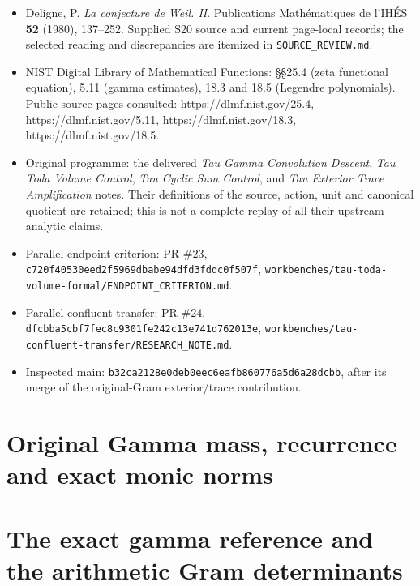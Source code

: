\documentclass[11pt,a4paper]{article}
\begin{document}
\begin{itemize}
\tightlist
\item
  Deligne, P. \emph{La conjecture de Weil. II}. Publications Mathématiques de l'IHÉS \textbf{52} (1980), 137--252. Supplied S20 source and current page-local records; the selected reading and discrepancies are itemized in \nolinkurl{SOURCE_REVIEW.md}.
\item
  NIST Digital Library of Mathematical Functions: §§25.4 (zeta functional equation), 5.11 (gamma estimates), 18.3 and 18.5 (Legendre polynomials). Public source pages consulted: https://dlmf.nist.gov/25.4, https://dlmf.nist.gov/5.11, https://dlmf.nist.gov/18.3, https://dlmf.nist.gov/18.5.
\item
  Original programme: the delivered \emph{Tau Gamma Convolution Descent}, \emph{Tau Toda Volume Control}, \emph{Tau Cyclic Sum Control}, and \emph{Tau Exterior Trace Amplification} notes. Their definitions of the source, action, unit and canonical quotient are retained; this is not a complete replay of all their upstream analytic claims.
\item
  Parallel endpoint criterion: PR \#23, \nolinkurl{c720f40530eed2f5969dbabe94dfd3fddc0f507f}, \nolinkurl{workbenches/tau-toda-volume-formal/ENDPOINT_CRITERION.md}.
\item
  Parallel confluent transfer: PR \#24, \nolinkurl{dfcbba5cbf7fec8c9301fe242c13e741d762013e}, \nolinkurl{workbenches/tau-confluent-transfer/RESEARCH_NOTE.md}.
\item
  Inspected main: \nolinkurl{b32ca2128e0deb0eec6eafb860776a5d6a28dcbb}, after its merge of the original-Gram exterior/trace contribution.
\end{itemize}

\endgroup

\clearpage
\begingroup


\setcounter{equation}{0}
\renewcommand{\theequation}{TGR.\arabic{equation}}
\section*{Original Gamma mass, recurrence and exact monic norms}
\section{The exact gamma reference and the arithmetic Gram determinants}
\label{tgr:sec:theta-gamma-reference}
\end{document}
